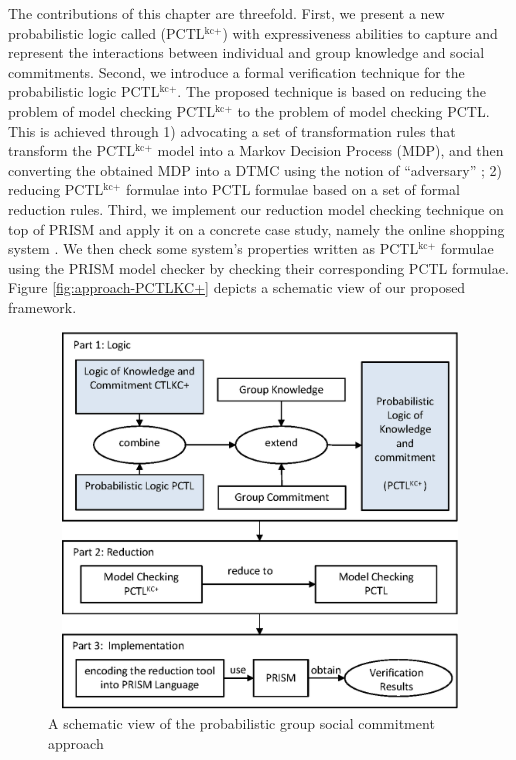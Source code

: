 The contributions of this chapter are threefold. First, we present a new probabilistic logic called (PCTL$^{\textrm{kc+}}$) with expressiveness abilities to capture and represent the interactions between individual and group knowledge and social commitments.
Second, we introduce a formal verification technique for the probabilistic logic PCTL$^{\textrm{kc+}}$. The proposed technique is based on reducing
the problem of model checking PCTL$^{\textrm{kc+}}$ to the problem
of model checking PCTL. This is achieved through 1) advocating a
set of transformation rules that transform the
PCTL$^{\textrm{kc+}}$ model into a Markov Decision Process (MDP),
and then converting the obtained MDP into a DTMC using the notion
of ``adversary'' \cite{Forejt2011}; 2) reducing
PCTL$^{\textrm{kc+}}$ formulae into PCTL formulae based on a set
of formal reduction rules. Third, we implement our reduction model checking
technique on top of PRISM and apply it on a concrete case study,
namely the online shopping system \cite{Gomaa2011}. We then check
some system's properties written as PCTL$^{\textrm{kc+}}$ formulae
using the PRISM model checker by checking their corresponding PCTL
formulae. Figure \ref{fig:approach-PCTLKC+} depicts a schematic
view of our proposed framework.


\begin{figure}[t]
                \begin{center}
                \includegraphics[width=14cm, height=10cm]{chap5/img/approach-cha5-new.eps}
                \end{center}
                \caption{A schematic view of the probabilistic group social commitment approach} \label{fig:approach-PCTLKC+}
                \label{Stack}
                \end{figure}



